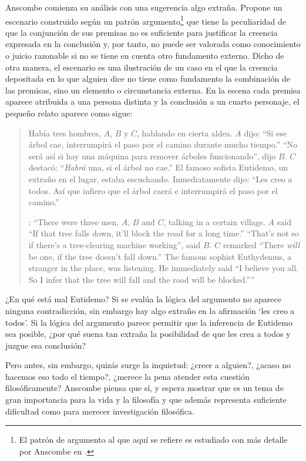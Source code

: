 Anscombe comienza su análisis con una sugerencia algo extraña. Propone un escenario construido según un patrón argumento\footnote{El patrón de argumento al que aquí se refiere es estudiado con más detalle por Anscombe en \cite{anscombe2015logic:qpa}.} que tiene la peculiaridad de que la conjunción de sus premisas no es suficiente para justificar la creencia expresada en la conclusión y, por tanto, no puede ser valorada como conocimiento o juicio razonable si no se tiene en cuenta otro fundamento externo. Dicho de otra manera, el escenario es una ilustración de un caso en el que la creencia depositada en lo que alguien dice no tiene como fundamento la combinación de las premisas, sino un elemento o circunstancia externa. En la escena cada premisa aparece atribuida a una persona distinta y la conclusión a un cuarto personaje, el pequeño relato aparece como sigue: \blockquote[{\cite[1]{anscombe2008faith:tobelieve}}: \enquote{There were three men, $A$, $B$ and $C$, talking in a certain village. $A$ said ``If that tree falls down, it'll block the road for a long time.'' ``That's not so if there's a tree-clearing machine working'', said $B$. $C$ remarked ``There \emph{will} be one, if the tree doesn't fall down.'' The famous sophist Euthydemus, a stranger in the place, was listening. He immediately said ``I believe you all. So I infer that the tree will fall and the road will be blocked.''}]{Había tres hombres, $A$, $B$ y $C$, hablando en cierta aldea. $A$ dijo: ``Si ese árbol cae, interrumpirá el paso por el camino durante mucho tiempo.'' ``No será así si hay una máquina para remover árboles funcionando'', dijo $B$. $C$ destacó: ``\emph{Habrá} una, si el árbol no cae.'' El famoso sofista Eutidemo, un extraño en el lugar, estaba escuchando. Inmediatamente dijo: ``Les creo a todos. Así que infiero que el árbol caerá e interrumpirá el paso por el camino.''}

¿En qué está mal Eutidemo? Si se evalúa la lógica del argumento no aparece ninguna contradicción, sin embargo hay algo extraño en la afirmación \enquote*{les creo a todos}. Si la lógica del argumento parece permitir que la inferencia de Eutidemo sea posible, ¿por qué suena tan extraña la posibilidad de que les crea a todos y juzgue esa conclusión?

Pero antes, sin embargo, quizás surge la inquietud: ¿creer a alguien?, ¿acaso no hacemos eso todo el tiempo?, ¿merece la pena atender esta cuestión filosóficamente? Anscombe piensa que sí, y espera mostrar que es un tema de gran importancia para la vida y la filosofía y que además representa suficiente dificultad como para merecer investigación filosófica.


